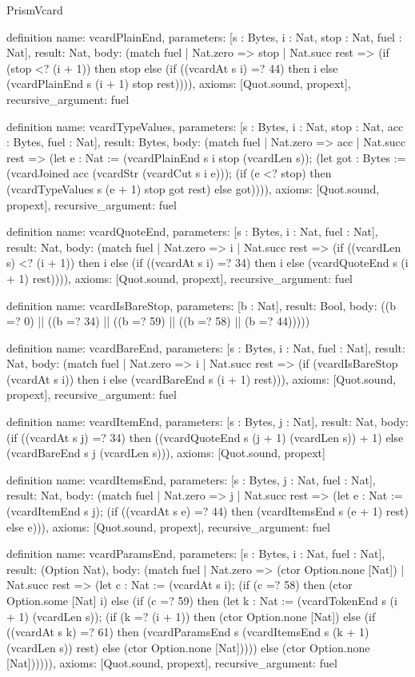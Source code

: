 \begin{lexlean}{PrismVcard}
\begin{semanticmodule}
definition{
  name: vcardPlainEnd,
  parameters: [s : Bytes, i : Nat, stop : Nat, fuel : Nat],
  result: Nat,
  body: (match fuel
    | Nat.zero => stop
    | Nat.succ rest => (if (stop <? (i + 1)) then stop else (if ((vcardAt s i) =? 44) then i else (vcardPlainEnd s (i + 1) stop rest)))),
  axioms: [Quot.sound, propext],
  recursive_argument: fuel
}

definition{
  name: vcardTypeValues,
  parameters: [s : Bytes, i : Nat, stop : Nat, acc : Bytes, fuel : Nat],
  result: Bytes,
  body: (match fuel
    | Nat.zero => acc
    | Nat.succ rest => (let e : Nat := (vcardPlainEnd s i stop (vcardLen s)); (let got : Bytes := (vcardJoined acc (vcardStr (vcardCut s i e))); (if (e <? stop) then (vcardTypeValues s (e + 1) stop got rest) else got)))),
  axioms: [Quot.sound, propext],
  recursive_argument: fuel
}

definition{
  name: vcardQuoteEnd,
  parameters: [s : Bytes, i : Nat, fuel : Nat],
  result: Nat,
  body: (match fuel
    | Nat.zero => i
    | Nat.succ rest => (if ((vcardLen s) <? (i + 1)) then i else (if ((vcardAt s i) =? 34) then i else (vcardQuoteEnd s (i + 1) rest)))),
  axioms: [Quot.sound, propext],
  recursive_argument: fuel
}

definition{
  name: vcardIsBareStop,
  parameters: [b : Nat],
  result: Bool,
  body: ((b =? 0) || ((b =? 34) || ((b =? 59) || ((b =? 58) || (b =? 44)))))
}

definition{
  name: vcardBareEnd,
  parameters: [s : Bytes, i : Nat, fuel : Nat],
  result: Nat,
  body: (match fuel
    | Nat.zero => i
    | Nat.succ rest => (if (vcardIsBareStop (vcardAt s i)) then i else (vcardBareEnd s (i + 1) rest))),
  axioms: [Quot.sound, propext],
  recursive_argument: fuel
}

definition{
  name: vcardItemEnd,
  parameters: [s : Bytes, j : Nat],
  result: Nat,
  body: (if ((vcardAt s j) =? 34) then ((vcardQuoteEnd s (j + 1) (vcardLen s)) + 1) else (vcardBareEnd s j (vcardLen s))),
  axioms: [Quot.sound, propext]
}

definition{
  name: vcardItemsEnd,
  parameters: [s : Bytes, j : Nat, fuel : Nat],
  result: Nat,
  body: (match fuel
    | Nat.zero => j
    | Nat.succ rest => (let e : Nat := (vcardItemEnd s j); (if ((vcardAt s e) =? 44) then (vcardItemsEnd s (e + 1) rest) else e))),
  axioms: [Quot.sound, propext],
  recursive_argument: fuel
}

definition{
  name: vcardParamsEnd,
  parameters: [s : Bytes, i : Nat, fuel : Nat],
  result: (Option Nat),
  body: (match fuel
    | Nat.zero => (ctor Option.none [Nat])
    | Nat.succ rest => (let c : Nat := (vcardAt s i); (if (c =? 58) then (ctor Option.some [Nat] i) else (if (c =? 59) then (let k : Nat := (vcardTokenEnd s (i + 1) (vcardLen s)); (if (k =? (i + 1)) then (ctor Option.none [Nat]) else (if ((vcardAt s k) =? 61) then (vcardParamsEnd s (vcardItemsEnd s (k + 1) (vcardLen s)) rest) else (ctor Option.none [Nat])))) else (ctor Option.none [Nat]))))),
  axioms: [Quot.sound, propext],
  recursive_argument: fuel
}


\end{semanticmodule}
\end{lexlean}
